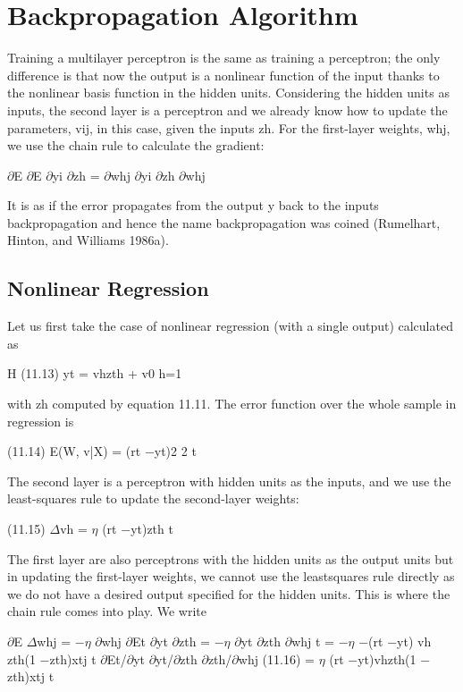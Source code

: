 \section{Backpropagation Algorithm}

Training a multilayer perceptron is the same as training a perceptron; the only difference is that now the output is a nonlinear function of the input thanks to the nonlinear basis function in the hidden units. Considering the hidden units as inputs, the second layer is a perceptron and we already know how to update the parameters, vij, in this case, given the inputs zh. For the first-layer weights, whj, we use the chain rule to calculate the gradient:

$\partial$E $\partial$E $\partial$yi $\partial$zh = $\partial$whj $\partial$yi $\partial$zh $\partial$whj

It is as if the error propagates from the output y back to the inputs backpropagation and hence the name backpropagation was coined (Rumelhart, Hinton, and Williams 1986a).

\subsection{Nonlinear Regression}

Let us first take the case of nonlinear regression (with a single output) calculated as

H (11.13) yt = vhzth + v0 h=1

with zh computed by equation 11.11. The error function over the whole sample in regression is

(11.14) E(W, v|X) = (rt $-$yt)2 2 t

The second layer is a perceptron with hidden units as the inputs, and we use the least-squares rule to update the second-layer weights:

(11.15) $\Delta$vh = $\eta$ (rt $-$yt)zth t

The first layer are also perceptrons with the hidden units as the output units but in updating the first-layer weights, we cannot use the leastsquares rule directly as we do not have a desired output specified for the hidden units. This is where the chain rule comes into play. We write

$\partial$E $\Delta$whj = $-$$\eta$ $\partial$whj $\partial$Et $\partial$yt $\partial$zth = $-$$\eta$ $\partial$yt $\partial$zth $\partial$whj t = $-$$\eta$ $-$(rt $-$yt) vh zth(1 $-$zth)xtj t $\partial$Et/$\partial$yt $\partial$yt/$\partial$zth $\partial$zth/$\partial$whj (11.16) = $\eta$ (rt $-$yt)vhzth(1 $-$zth)xtj t

